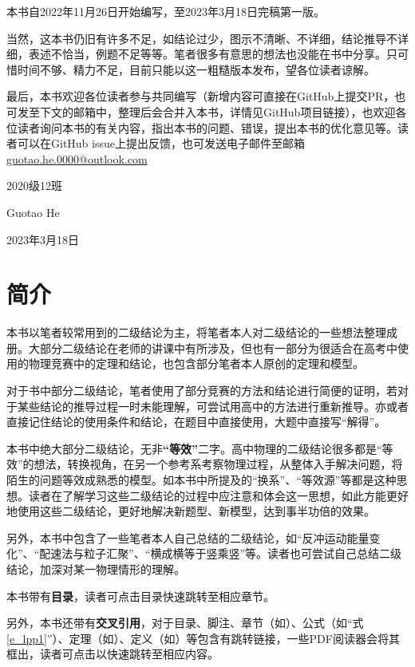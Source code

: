 \documentclass{gbook}
\begin{document}
本书自2022年11月26日开始编写，至2023年3月18日完稿第一版。

当然，这本书仍旧有许多不足，如结论过少，图示不清晰、不详细，结论推导不详细，表述不恰当，例题不足等等。笔者很多有意思的想法也没能在书中分享。只可惜时间不够、精力不足，目前只能以这一粗糙版本发布，望各位读者谅解。

最后，本书欢迎各位读者参与共同编写（新增内容可直接在GitHub上提交PR，也可发至下文的邮箱中，整理后会合并入本书，详情见GitHub项目链接），也欢迎各位读者询问本书的有关内容，指出本书的问题、错误，提出本书的优化意见等。读者可以在GitHub issue上提出反馈，也可发送电子邮件至邮箱\url{guotao.he.0000@outlook.com}
~\\

\begin{flushright}
2020级12班

Guotao He

2023年3月18日
\end{flushright}
\newpage

\section*{简介}


本书以笔者较常用到的二级结论为主，将笔者本人对二级结论的一些想法整理成册。大部分二级结论在老师的讲课中有所涉及，但也有一部分为很适合在高考中使用的物理竞赛中的定理和结论，也包含部分笔者本人原创的定理和模型。

对于书中部分二级结论，笔者使用了部分竞赛的方法和结论进行简便的证明，若对于某些结论的推导过程一时未能理解，可尝试用高中的方法进行重新推导。亦或者直接记住结论的使用条件和结论，在题目中直接使用，大题中直接写“解得”。

本书中绝大部分二级结论，无非\textbf{“等效”}二字。高中物理的二级结论很多都是“等效”的想法，转换视角，在另一个参考系考察物理过程，从整体入手解决问题，将陌生的问题等效成熟悉的模型。如本书中所提及的“换系”、“等效源”等都是这种思想。读者在了解学习这些二级结论的过程中应注意和体会这一思想，如此方能更好地使用这些二级结论，更好地解决新题型、新模型，达到事半功倍的效果。

另外，本书中包含了一些笔者本人自己总结的二级结论，如“反冲运动能量变化”、“配速法与粒子汇聚”、“横成横等于竖乘竖”等。读者也可尝试自己总结二级结论，加深对某一物理情形的理解。

本书带有\textbf{目录}，读者可点击目录快速跳转至相应章节。

另外，本书还带有\textbf{交叉引用}，对于目录、脚注、章节（如）、公式（如“式\eqref{e_lpp1}”）、定理（如）、定义（如）等包含有跳转链接，一些PDF阅读器会将其框出，读者可点击以快速跳转至相应内容。
\end{document}
